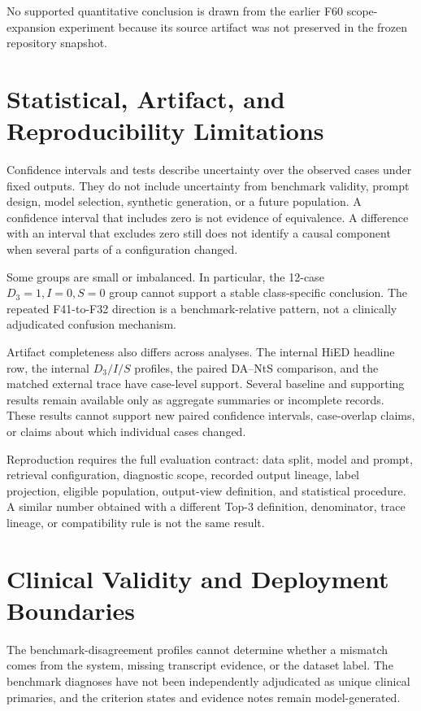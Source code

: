 No supported quantitative conclusion is drawn from the earlier F60 scope-expansion experiment because its source artifact was not preserved in the frozen repository snapshot.

\section{Statistical, Artifact, and Reproducibility Limitations}
\label{sec:statistical-reproducibility-limitations}

Confidence intervals and tests describe uncertainty over the observed cases under fixed outputs. They do not include uncertainty from benchmark validity, prompt design, model selection, synthetic generation, or a future population. A confidence interval that includes zero is not evidence of equivalence. A difference with an interval that excludes zero still does not identify a causal component when several parts of a configuration changed.

Some groups are small or imbalanced. In particular, the 12-case $D_3=1,I=0,S=0$ group cannot support a stable class-specific conclusion. The repeated F41-to-F32 direction is a benchmark-relative pattern, not a clinically adjudicated confusion mechanism.

Artifact completeness also differs across analyses. The internal HiED headline row, the internal $D_3/I/S$ profiles, the paired DA--NtS comparison, and the matched external trace have case-level support. Several baseline and supporting results remain available only as aggregate summaries or incomplete records. These results cannot support new paired confidence intervals, case-overlap claims, or claims about which individual cases changed.

Reproduction requires the full evaluation contract: data split, model and prompt, retrieval configuration, diagnostic scope, recorded output lineage, label projection, eligible population, output-view definition, and statistical procedure. A similar number obtained with a different Top-3 definition, denominator, trace lineage, or compatibility rule is not the same result.

\section{Clinical Validity and Deployment Boundaries}
\label{sec:clinical-deployment-boundaries}

The benchmark-disagreement profiles cannot determine whether a mismatch comes from the system, missing transcript evidence, or the dataset label. The benchmark diagnoses have not been independently adjudicated as unique clinical primaries, and the criterion states and evidence notes remain model-generated.


